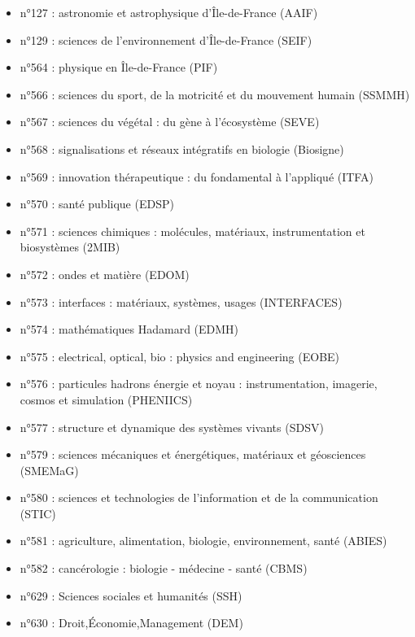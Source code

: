 \documentclass[french,12pt,a4paper]{book}
\begin{document}
\begin{itemize}
\renewcommand{\labelitemi}{$\bullet$}
\item n°127 : astronomie et astrophysique d'Île-de-France (AAIF)
\item n°129 : sciences de l'environnement d’Île-de-France (SEIF)
\item n°564 : physique en Île-de-France (PIF)
\item n°566 : sciences du sport, de la motricité et du mouvement humain (SSMMH)
\item n°567 : sciences du végétal : du gène à l'écosystème (SEVE)
\item n°568 : signalisations et réseaux intégratifs en biologie (Biosigne)
\item n°569 : innovation thérapeutique : du fondamental à l'appliqué (ITFA)
\item n°570 : santé publique (EDSP)
\item n°571 : sciences chimiques : molécules, matériaux, instrumentation et biosystèmes (2MIB)
\item n°572 : ondes et matière (EDOM)
\item n°573 : interfaces : matériaux, systèmes, usages (INTERFACES)
\item n°574 : mathématiques Hadamard (EDMH)
\item n°575 : electrical, optical, bio : physics and engineering  (EOBE)
\item n°576 : particules hadrons énergie et noyau : instrumentation, imagerie, cosmos et simulation (PHENIICS)
\item n°577 : structure et dynamique des systèmes vivants (SDSV)
\item n°579 : sciences mécaniques et énergétiques, matériaux et géosciences  (SMEMaG)
\item n°580 : sciences et technologies de l'information et de la communication (STIC)
\item n°581 : agriculture, alimentation, biologie, environnement, santé (ABIES)
\item n°582 : cancérologie : biologie - médecine - santé (CBMS)
\item n°629 : Sciences sociales et humanités (SSH)
\item n°630 : Droit,Économie,Management (DEM)
\end{itemize}
\end{document}
